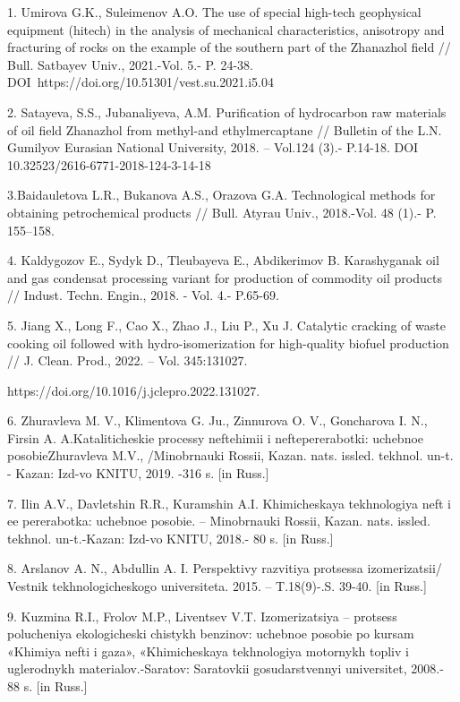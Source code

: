 \begin{noparindent}
1. Umirova G.K., Suleimenov A.O. The use of special high-tech
geophysical equipment (hitech) in the analysis of mechanical
characteristics, anisotropy and fracturing of rocks on the example of
the southern part of the Zhanazhol field // Bull. Satbayev Univ.,
2021.-Vol. 5.- P. 24-38. DOI~https://doi.org/10.51301/vest.su.2021.i5.04

2. Satayeva, S.S., Jubanaliyeva, A.M. Purification of hydrocarbon raw
materials of oil field Zhanazhol from methyl-and ethylmercaptane //
Bulletin of the L.N. Gumilyov Eurasian National University, 2018. --
Vol.124 (3).- P.14-18. DOI 10.32523/2616-6771-2018-124-3-14-18

3.Baidauletova L.R., Bukanova A.S., Orazova G.A. Technological methods
for obtaining petrochemical products // Bull. Atyrau Univ., 2018.-Vol.
48 (1).- P. 155--158.

4. Kaldygozov E., Sydyk D., Tleubayeva E., Abdikerimov B. Karashyganak
oil and gas condensat processing variant for production of commodity oil
products // Indust. Techn. Engin., 2018. - Vol. 4.- P.65-69.

5. Jiang X., Long F., Cao X., Zhao J., Liu P., Xu J. Catalytic cracking
of waste cooking oil followed with hydro-isomerization for high-quality
biofuel production // J. Clean. Prod., 2022. -- Vol. 345:131027.

https://doi.org/10.1016/j.jclepro.2022.131027.

6. Zhuravleva M. V., Klimentova G. Ju., Zinnurova O. V., Goncharova I.
N., Firsin A. A.Kataliticheskie processy neftehimii i neftepererabotki:
uchebnoe posobieZhuravleva M.V., /Minobrnauki Rossii, Kazan. nats.
issled. tekhnol. un-t. - Kazan\textquotesingle: Izd-vo KNITU, 2019. -316
s. {[}in Russ.{]}

7. Il\textquotesingle in A.V., Davletshin R.R., Kuramshin A.I.
Khimicheskaya tekhnologiya neft\textquotesingle{} i ee pererabotka:
uchebnoe posobie. -- Minobrnauki Rossii, Kazan. nats. issled. tekhnol.
un-t.-Kazan\textquotesingle: Izd-vo KNITU, 2018.- 80 s. {[}in Russ.{]}

8. Arslanov A. N., Abdullin A. I. Perspektivy razvitiya protsessa
izomerizatsii/ Vestnik tekhnologicheskogo universiteta. 2015. --
T.18(9)-.S. 39-40. {[}in Russ.{]}

9. Kuz\textquotesingle mina R.I., Frolov M.P., Liventsev V.T.
Izomerizatsiya -- protsess polucheniya ekologicheski chistykh benzinov:
uchebnoe posobie po kursam «Khimiya nefti i gaza», «Khimicheskaya
tekhnologiya motornykh topliv i uglerodnykh materialov.-Saratov:
Saratovkii gosudarstvennyi universitet, 2008.- 88 s. {[}in Russ.{]}


\end{noparindent}
